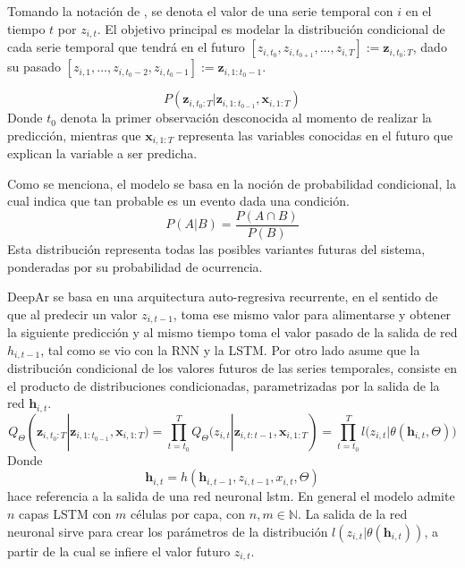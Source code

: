 \documentclass[12pt,letterpaper]{article}
\begin{document}
Tomando la notación de \cite{salinas2020deepar}, se denota el valor de una serie temporal con $i$ en el tiempo $t$ por $z_{i,t}$. El objetivo principal es modelar la distribución condicional de cada serie temporal que tendrá en el futuro $[z_{i,t_0}, z_{i,t_{0+1}}, \dots,z_{i,T}]:= \textbf{z}_{i,t_0:T}$, dado su pasado $[z_{i,1}, \dots, z_{i,t_0 - 2},z_{i,t_0-1}]:=\textbf{z}_{i, 1:t_0-1}$.

\begin{equation}
    P(\textbf{z}_{i,t_0:T} | \textbf{z}_{i,1:t_{0-1}}, \textbf{x}_{i,1:T})
\end{equation}
Donde $t_0$ denota la primer observación desconocida al momento de realizar la predicción, mientras que $\textbf{x}_{i,1:T}$ representa las variables conocidas en el futuro que explican la variable a ser predicha. 

Como se menciona, el modelo se basa en la noción de probabilidad condicional, la cual indica que tan probable es un evento dada una condición.
\[
P(A|B) = \frac{P(A\cap B)}{P(B)}
\]
Esta distribución representa todas las posibles variantes futuras del sistema, ponderadas por su probabilidad de ocurrencia. 

DeepAr se basa en una arquitectura auto-regresiva recurrente, en el sentido de que al predecir un valor $z_{i,t-1}$, toma ese mismo valor para alimentarse y obtener la siguiente predicción y al mismo tiempo toma el valor pasado de la salida de red $h_{i,t-1}$, tal como se vio con la RNN y la LSTM. Por otro lado asume que la distribución condicional de los valores futuros de las series temporales, consiste en el producto de distribuciones condicionadas, parametrizadas por la salida de la red $\textbf{h}_{i,t}$.
\begin{equation}
    Q_\Theta( \textbf{z}_{i,t_0:T} | \textbf{z}_{i,1:t_{0-1}}, \textbf{x}_{i,1:T})=\prod_{t=t_0}^T Q_\Theta(z_{i,t}|\textbf{z}_{i,t:t-1}, \textbf{x}_{i,1:T}) =\prod_{t=t_0}^T l\big( z_{i,t} |\theta(\textbf{h}_{i,t}, \Theta)\big)
\end{equation}
Donde 
\begin{equation}
    \textbf{h}_{i,t}=h(\textbf{h}_{i,t-1}, z_{i,t-1},x_{i,t}, \Theta)
\end{equation}
hace referencia a la salida de una red neuronal lstm. En general el modelo admite $n$ capas LSTM con $m$ células por capa, con $n,m \in \mathbb{N}$. La salida de la red neuronal sirve para crear los parámetros de la distribución $l(z_{i,t}|\theta(\textbf{h}_{i,t}))$, a partir de la cual se infiere el valor futuro $z_{i,t}$.
\end{document}
